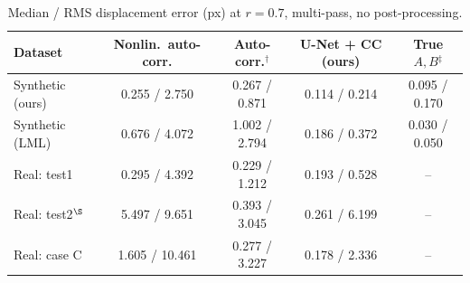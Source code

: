 \begin{table}[t]
\centering
\caption{Median / RMS displacement error (px) at $r=0.7$, multi-pass, no post-processing.}
\label{tab:accuracy}
\small
\begin{tabular}{lcccc}
\toprule
Dataset & Nonlin.\ auto-corr. & Auto-corr.$^\dagger$ & U-Net + CC (ours) & True $A,B$$^\ddagger$ \\
\midrule
Synthetic (ours) & 0.255 / 2.750 & 0.267 / 0.871 & 0.114 / 0.214 & 0.095 / 0.170 \\
Synthetic (LML) & 0.676 / 4.072 & 1.002 / 2.794 & 0.186 / 0.372 & 0.030 / 0.050 \\
Real: test1 & 0.295 / 4.392 & 0.229 / 1.212 & 0.193 / 0.528 & -- \\
Real: test2$^\S$ & 5.497 / 9.651 & 0.393 / 3.045 & 0.261 / 6.199 & -- \\
Real: case C & 1.605 / 10.461 & 0.277 / 3.227 & 0.178 / 2.336 & -- \\
\bottomrule
\end{tabular}
\end{table}
